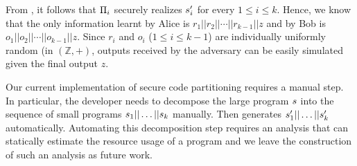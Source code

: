  From , it follows that
$\Pi_i$ securely realizes $s'_i$ for every $1\leq i\leq
k$. Hence, we know that the only information learnt by Alice is
$r_1||r_2||\cdots||r_{k-1}||z$ and by Bob is
$o_1||o_2||\cdots||o_{k-1}||z$. Since $r_i$ and $o_i$ ($1\leq i\leq
k-1$) are individually uniformly random (in $(\mathbb{Z},+)$, outputs
received by the adversary can be easily simulated given the final
output $z$.

Our current implementation of secure code partitioning requires a manual step.
In particular, the developer needs to decompose the large program $s$ into 
the sequence of small programs $s_1||\dots||s_k$ manually.
Then \tool generates $s'_1||\dots||s'_k$ automatically.
Automating this decomposition step requires an analysis that can 
statically estimate the resource usage of a \tool program and we leave
the construction of such an analysis as future work.
